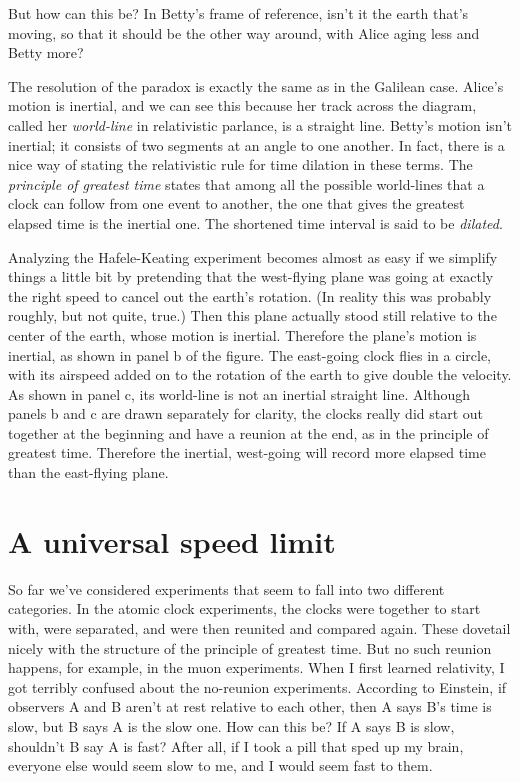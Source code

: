 But how can this be? In Betty's frame of reference, isn't it the earth that's moving, so that it should
be the other way around, with Alice aging less and Betty more?

The resolution of the paradox is exactly the same as
in the Galilean case. Alice's motion is inertial, and we can see this because her track across the diagram, called
her \emph{world-line} in relativistic parlance, is a straight line. Betty's motion isn't inertial; it consists of
two segments at an angle to one another. In fact, there is a nice way of stating the relativistic rule for time dilation
in these terms. The \emph{principle of greatest time} states that among all the possible world-lines that a clock
can follow from one event to another, the one that gives the greatest elapsed time is the inertial one.
The shortened time interval is said to be \emph{dilated}.

Analyzing the Hafele-Keating experiment becomes almost as easy if we simplify things a little bit by pretending
that the west-flying plane was going at exactly the right speed to cancel out the earth's rotation. (In reality this
was probably roughly, but not quite, true.) Then this plane actually stood still relative to the center of the earth,
whose motion is inertial. Therefore the plane's motion is inertial, as shown in panel b of the figure. The east-going
clock flies in a circle, with its airspeed added on to the rotation of the earth to give double the velocity.
As shown in panel c, its world-line is not an inertial straight line. Although panels b and c are drawn separately
for clarity, the clocks really did start out together at the beginning and have a reunion at the end, as in
the principle of greatest time. Therefore the inertial, west-going will record more elapsed time
than the east-flying plane.


\section{A universal speed limit}

So far we've considered experiments that seem to fall into two different categories. In the 
atomic clock experiments,
the clocks were together to start with, were separated, and were then reunited and compared again. These
dovetail nicely with the structure of the principle of greatest time. But 
no such reunion happens, for example, in the muon experiments.
When I first learned relativity, I got terribly confused about the no-reunion experiments.
According to Einstein,
      if observers A and B aren't at rest relative to each other, then A says B's time
      is slow, but B says A is the slow one. How can this be? If A says B is slow, shouldn't
      B say A is fast? After all, if I took a pill that sped up my brain, everyone else would
      seem slow to me, and I would seem fast to them.

